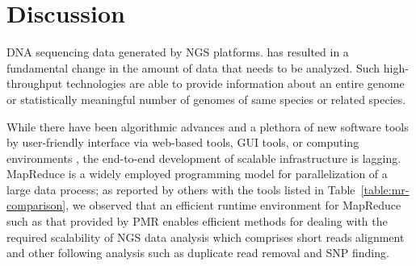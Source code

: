\documentclass{acm_proc_article-sp}
\begin{document}
\section{Discussion}\label{sec:discussions}


DNA sequencing data generated by NGS
platforms\cite{metzker2010,1000genome,wang2009-natrevgen,alex2009,mcpherson2009}.
has resulted in a fundamental change in the amount of data that needs
to be analyzed. Such high-throughput technologies are able to provide
information about an entire genome or statistically meaningful number
of genomes of same species or related species.


While there have been algorithmic advances and a plethora of new
software tools by user-friendly interface via web-based tools, GUI
tools, or computing environments \cite{galaxy}, the end-to-end
development of scalable infrastructure is lagging.  MapReduce is a
widely employed programming model for parallelization of a large data
process; as reported by others with the tools listed in
Table~\ref{table:mr-comparison}, we observed that an efficient 
runtime environment for MapReduce such as that provided by PMR 
enables efficient methods for dealing with the required
scalability of NGS data analysis which comprises short reads alignment
and other following analysis such as duplicate read removal and SNP
finding.

\end{document}
